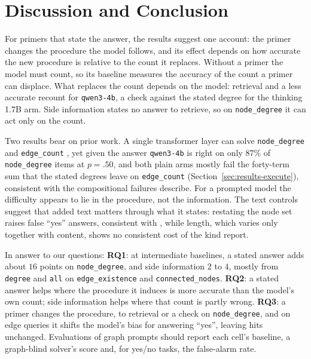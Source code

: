 \documentclass[11pt]{article}
\begin{document}
\section{Discussion and Conclusion}
\label{sec:discussion}

For primers that state the answer, the results suggest one account: the
primer changes the procedure the model follows, and its effect depends on how
accurate the new procedure is relative to the count it replaces. Without a
primer the model must count, so its baseline measures the accuracy of the
count a primer can displace. What replaces the count depends on the model:
retrieval and a less accurate recount for \texttt{qwen3-4b}, a check against the
stated degree for the thinking 1.7B arm. Side information states no answer to
retrieve, so on \texttt{node\_degree} it can act only on the count.

Two results bear on prior work. A single transformer layer can solve
\texttt{node\_degree} and \texttt{edge\_count}
\citep{sanford2024understanding}, yet given the answer \texttt{qwen3-4b} is
right on only $87\%$ of \texttt{node\_degree} items at $p{=}.50$, and both plain
arms mostly fail the forty-term sum that the stated degrees leave on
\texttt{edge\_count} (Section~\ref{sec:results-execute}), consistent with the
compositional failures \citet{dziri2023faithandfate} describe. For a prompted
model the difficulty appears to lie in the procedure, not the information. The
text controls suggest that added text matters through what it states:
restating the node set raises false ``yes'' answers, consistent with
\citet{shi2023distracted}, while length, which varies only together with
content, shows no consistent cost of the kind \citet{levy2024sametask} report.

In answer to our questions: \textbf{RQ1}: at intermediate baselines, a stated
answer adds about $16$ points on \texttt{node\_degree}, and side information
$2$ to $4$, mostly from \texttt{degree} and \texttt{all} on
\texttt{edge\_existence} and \texttt{connected\_nodes}. \textbf{RQ2}: a stated
answer helps where the procedure it induces is more accurate than the model's
own count; side information helps where that count is partly wrong.
\textbf{RQ3}: a primer changes the procedure, to retrieval or a check on
\texttt{node\_degree}, and on edge queries it shifts the model's bias for
answering ``yes'', leaving hits unchanged. Evaluations of graph prompts should report each cell's
baseline, a graph-blind solver's score and, for yes/no tasks, the false-alarm
rate.
\end{document}
